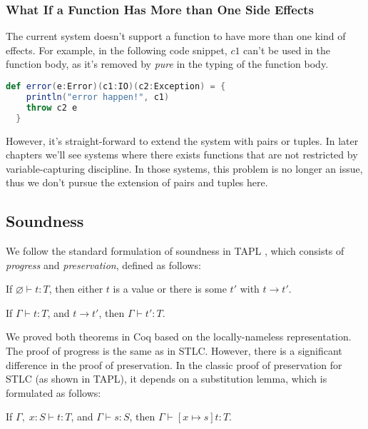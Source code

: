 \subsubsection{What If a Function Has More than One Side Effects}

The current system doesn't support a function to have more than one
kind of effects. For example, in the following code snippet, $c1$
can't be used in the function body, as it's removed by \emph{pure} in
the typing of the function body.

\begin{lstlisting}[language=Scala]
  def error(e:Error)(c1:IO)(c2:Exception) = {
    println("error happen!", c1)
    throw c2 e
  }
\end{lstlisting}

However, it's straight-forward to extend the system with pairs or
tuples. In later chapters we'll see systems where there exists
functions that are not restricted by variable-capturing discipline.
In those systems, this problem is no longer an issue, thus we don't
pursue the extension of pairs and tuples here.

\subsection{Soundness}

We follow the standard formulation of soundness in TAPL
\cite{bpierce2002types}, which consists of \emph{progress} and
\emph{preservation}, defined as follows:

\begin{theorem}[Progress]
If $\varnothing \vdash t : T$, then either $t$ is a value or there is some
$t'$ with $t \longrightarrow t'$.
\end{theorem}

\begin{theorem}[Preservation]
If $\Gamma \vdash t : T$, and $t \longrightarrow t'$, then $\Gamma
\vdash t' : T$.
\end{theorem}

We proved both theorems in Coq based on the locally-nameless
representation. The proof of progress is the same as in STLC. However,
there is a significant difference in the proof of preservation. In the
classic proof of preservation for STLC (as shown in TAPL), it depends
on a substitution lemma, which is formulated as follows:

\begin{lemma}
If $\Gamma,\; x:S \vdash t : T$, and $\Gamma \vdash s : S$, then $\Gamma
\vdash [x \mapsto s]t : T$.
\end{lemma}

